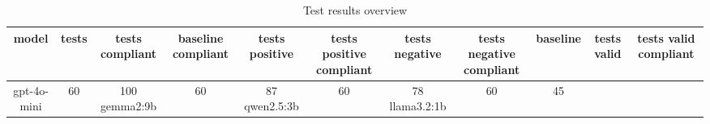 
  \begin{table}[h!]
  \centering
  \begin{tabular}{|c|c|c|c|c|c|c|c|c|c|c|}
  \hline
  model & tests & tests compliant & baseline compliant & tests positive & tests positive compliant & tests negative & tests negative compliant & baseline & tests valid & tests valid compliant \\
  \hline
  gpt-4o-mini & 60 & 100%
\hline
gemma2:9b & 60 & 87%
\hline
qwen2.5:3b & 60 & 78%
\hline
llama3.2:1b & 60 & 45%
  \end{tabular}
  \caption{Test results overview}
  
  \end{table}
  